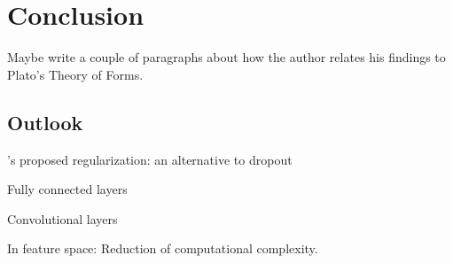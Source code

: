 \section{Conclusion}

Maybe write a couple of paragraphs about how the author relates his findings to Plato's Theory of Forms.

\subsection{Outlook}

\citet{owhadi20}'s proposed regularization: an alternative to dropout

Fully connected layers

Convolutional layers

In feature space: Reduction of computational complexity.